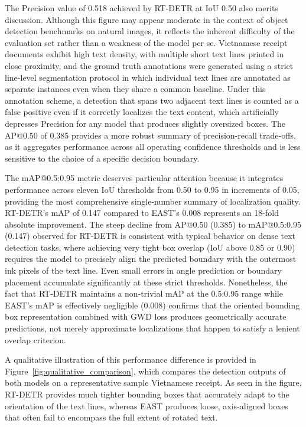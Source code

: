 The Precision value of 0.518 achieved by RT-DETR at IoU 0.50 also merits discussion. Although this figure may appear moderate in the context of object detection benchmarks on natural images, it reflects the inherent difficulty of the evaluation set rather than a weakness of the model per se. Vietnamese receipt documents exhibit high text density, with multiple short text lines printed in close proximity, and the ground truth annotations were generated using a strict line-level segmentation protocol in which individual text lines are annotated as separate instances even when they share a common baseline. Under this annotation scheme, a detection that spans two adjacent text lines is counted as a false positive even if it correctly localizes the text content, which artificially depresses Precision for any model that produces slightly oversized boxes. The AP@0.50 of 0.385 provides a more robust summary of precision-recall trade-offs, as it aggregates performance across all operating confidence thresholds and is less sensitive to the choice of a specific decision boundary.

The mAP@0.5:0.95 metric deserves particular attention because it integrates performance across eleven IoU thresholds from 0.50 to 0.95 in increments of 0.05, providing the most comprehensive single-number summary of localization quality. RT-DETR's mAP of 0.147 compared to EAST's 0.008 represents an 18-fold absolute improvement. The steep decline from AP@0.50 (0.385) to mAP@0.5:0.95 (0.147) observed for RT-DETR is consistent with typical behavior on dense text detection tasks, where achieving very tight box overlap (IoU above 0.85 or 0.90) requires the model to precisely align the predicted boundary with the outermost ink pixels of the text line. Even small errors in angle prediction or boundary placement accumulate significantly at these strict thresholds. Nonetheless, the fact that RT-DETR maintains a non-trivial mAP at the 0.5:0.95 range while EAST's mAP is effectively negligible (0.008) confirms that the oriented bounding box representation combined with GWD loss produces geometrically accurate predictions, not merely approximate localizations that happen to satisfy a lenient overlap criterion.

A qualitative illustration of this performance difference is provided in Figure~\ref{fig:qualitative_comparison}, which compares the detection outputs of both models on a representative sample Vietnamese receipt. As seen in the figure, RT-DETR provides much tighter bounding boxes that accurately adapt to the orientation of the text lines, whereas EAST produces loose, axis-aligned boxes that often fail to encompass the full extent of rotated text.

